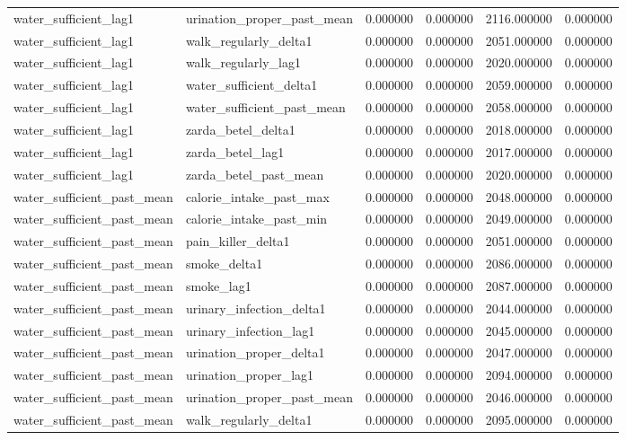 \begin{longtable}{llrrrr}
water\_sufficient\_lag1 & urination\_proper\_past\_mean & 0.000000 & 0.000000 & 2116.000000 & 0.000000 \\
water\_sufficient\_lag1 & walk\_regularly\_delta1 & 0.000000 & 0.000000 & 2051.000000 & 0.000000 \\
water\_sufficient\_lag1 & walk\_regularly\_lag1 & 0.000000 & 0.000000 & 2020.000000 & 0.000000 \\
water\_sufficient\_lag1 & water\_sufficient\_delta1 & 0.000000 & 0.000000 & 2059.000000 & 0.000000 \\
water\_sufficient\_lag1 & water\_sufficient\_past\_mean & 0.000000 & 0.000000 & 2058.000000 & 0.000000 \\
water\_sufficient\_lag1 & zarda\_betel\_delta1 & 0.000000 & 0.000000 & 2018.000000 & 0.000000 \\
water\_sufficient\_lag1 & zarda\_betel\_lag1 & 0.000000 & 0.000000 & 2017.000000 & 0.000000 \\
water\_sufficient\_lag1 & zarda\_betel\_past\_mean & 0.000000 & 0.000000 & 2020.000000 & 0.000000 \\
water\_sufficient\_past\_mean & calorie\_intake\_past\_max & 0.000000 & 0.000000 & 2048.000000 & 0.000000 \\
water\_sufficient\_past\_mean & calorie\_intake\_past\_min & 0.000000 & 0.000000 & 2049.000000 & 0.000000 \\
water\_sufficient\_past\_mean & pain\_killer\_delta1 & 0.000000 & 0.000000 & 2051.000000 & 0.000000 \\
water\_sufficient\_past\_mean & smoke\_delta1 & 0.000000 & 0.000000 & 2086.000000 & 0.000000 \\
water\_sufficient\_past\_mean & smoke\_lag1 & 0.000000 & 0.000000 & 2087.000000 & 0.000000 \\
water\_sufficient\_past\_mean & urinary\_infection\_delta1 & 0.000000 & 0.000000 & 2044.000000 & 0.000000 \\
water\_sufficient\_past\_mean & urinary\_infection\_lag1 & 0.000000 & 0.000000 & 2045.000000 & 0.000000 \\
water\_sufficient\_past\_mean & urination\_proper\_delta1 & 0.000000 & 0.000000 & 2047.000000 & 0.000000 \\
water\_sufficient\_past\_mean & urination\_proper\_lag1 & 0.000000 & 0.000000 & 2094.000000 & 0.000000 \\
water\_sufficient\_past\_mean & urination\_proper\_past\_mean & 0.000000 & 0.000000 & 2046.000000 & 0.000000 \\
water\_sufficient\_past\_mean & walk\_regularly\_delta1 & 0.000000 & 0.000000 & 2095.000000 & 0.000000 \\

\end{longtable}
